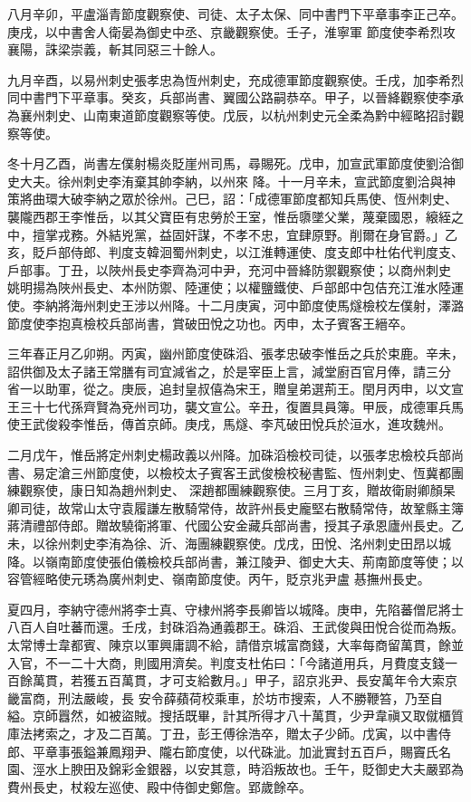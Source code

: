 \begin{pinyinscope}
 八月辛卯，平盧淄青節度觀察使、司徒、太子太保、同中書門下平章事李正己卒。庚戌，以中書舍人衛晏為御史中丞、京畿觀察使。壬子，淮寧軍
 節度使李希烈攻襄陽，誅梁崇義，斬其同惡三十餘人。



 九月辛酉，以易州刺史張孝忠為恆州刺史，充成德軍節度觀察使。壬戌，加李希烈同中書門下平章事。癸亥，兵部尚書、翼國公路嗣恭卒。甲子，以晉絳觀察使李承為襄州刺史、山南東道節度觀察等使。戊辰，以杭州刺史元全柔為黔中經略招討觀察等使。



 冬十月乙酉，尚書左僕射楊炎貶崖州司馬，尋賜死。戊申，加宣武軍節度使劉洽御史大夫。徐州刺史李洧棄其帥李納，以州來
 降。十一月辛未，宣武節度劉洽與神策將曲環大破李納之眾於徐州。己巳，詔：「成德軍節度都知兵馬使、恆州刺史、襲隴西郡王李惟岳，以其父寶臣有忠勞於王室，惟岳隳墜父業，蔑棄國恩，縗絰之中，擅掌戎務。外結兇黨，益固奸謀，不孝不忠，宜肆原野。削爾在身官爵。」乙亥，貶戶部侍郎、判度支韓洄蜀州刺史，以江淮轉運使、度支郎中杜佑代判度支、戶部事。丁丑，以陜州長史李齊為河中尹，充河中晉絳防禦觀察使；以商州刺史
 姚明揚為陜州長史、本州防禦、陸運使；以權鹽鐵使、戶部郎中包佶充江淮水陸運使。李納將海州刺史王涉以州降。十二月庚寅，河中節度使馬燧檢校左僕射，澤潞節度使李抱真檢校兵部尚書，賞破田悅之功也。丙申，太子賓客王縉卒。



 三年春正月乙卯朔。丙寅，幽州節度使硃滔、張孝忠破李惟岳之兵於束鹿。辛未，詔供御及太子諸王常膳有司宜減省之，於是宰臣上言，減堂廚百官月俸，請三分
 省一以助軍，從之。庚辰，追封皇叔僖為宋王，贈皇弟選荊王。閏月丙申，以文宣王三十七代孫齊賢為兗州司功，襲文宣公。辛丑，復置具員簿。甲辰，成德軍兵馬使王武俊殺李惟岳，傳首京師。庚戌，馬燧、李芃破田悅兵於洹水，進攻魏州。



 二月戊午，惟岳將定州刺史楊政義以州降。加硃滔檢校司徒，以張孝忠檢校兵部尚書、易定滄三州節度使，以檢校太子賓客王武俊檢校秘書監、恆州刺史、恆冀都團練觀察使，康日知為趙州刺史、
 深趙都團練觀察使。三月丁亥，贈故衛尉卿顏杲卿司徒，故常山太守袁履謙左散騎常侍，故許州長史龐堅右散騎常侍，故鞏縣主簿蔣清禮部侍郎。贈故驍衛將軍、代國公安金藏兵部尚書，授其子承恩廬州長史。乙未，以徐州刺史李洧為徐、沂、海團練觀察使。戊戌，田悅、洺州刺史田昂以城降。以嶺南節度使張伯儀檢校兵部尚書，兼江陵尹、御史大夫、荊南節度等使；以容管經略使元琇為廣州刺史、嶺南節度使。丙午，貶京兆尹盧
 惎撫州長史。



 夏四月，李納守德州將李士真、守棣州將李長卿皆以城降。庚申，先陷蕃僧尼將士八百人自吐蕃而還。壬戌，封硃滔為通義郡王。硃滔、王武俊與田悅合從而為叛。太常博士韋都賓、陳京以軍興庸調不給，請借京城富商錢，大率每商留萬貫，餘並入官，不一二十大商，則國用濟矣。判度支杜佑曰：「今諸道用兵，月費度支錢一百餘萬貫，若獲五百萬貫，才可支給數月。」甲子，詔京兆尹、長安萬年令大索京畿富商，刑法嚴峻，長
 安令薛蘋荷校乘車，於坊市搜索，人不勝鞭笞，乃至自縊。京師囂然，如被盜賊。搜括既畢，計其所得才八十萬貫，少尹韋禛又取僦櫃質庫法拷索之，才及二百萬。丁丑，彭王傅徐浩卒，贈太子少師。戊寅，以中書侍郎、平章事張鎰兼鳳翔尹、隴右節度使，以代硃泚。加泚實封五百戶，賜竇氏名園、涇水上腴田及錦彩金銀器，以安其意，時滔叛故也。壬午，貶御史大夫嚴郢為費州長史，杖殺左巡使、殿中侍御史鄭詹。郢歲餘卒。




\end{pinyinscope}
